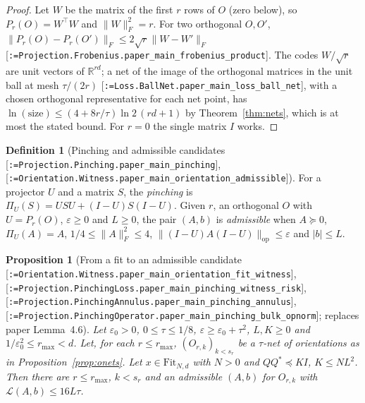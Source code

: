 \documentclass[11pt]{article}
\makeatletter
\newcommand{\formal@break}[1]{\@tfor\formal@tok:=#1\do{%
  \formal@tok
  \expandafter\ifx\formal@tok.\allowbreak\else
  \expandafter\ifx\formal@tok\_\allowbreak\fi\fi}}
\DeclareRobustCommand{\formal}[1]{\textnormal{[\texttt{\small\formal@break{#1}}]}}
\newcommand{\R}{\mathbb{R}}
\newcommand{\norm}[1]{\lVert #1\rVert}
\newcommand{\abs}[1]{\lvert #1\rvert}
\newcommand{\op}{\mathrm{op}}
\newcommand{\Fro}{F}
\newcommand{\Id}{I}
\newcommand{\Fit}{\mathrm{Fit}}
\theoremstyle{plain}
\newtheorem{proposition}[theorem]{Proposition}
\theoremstyle{definition}
\newtheorem{definition}[theorem]{Definition}
\makeatother
\begin{document}
\begin{proof}
Let $W$ be the matrix of the first $r$ rows of $O$ (zero below), so
$P_r(O) = W^{\top}W$ and $\norm{W}_\Fro^2 = r$. For two orthogonal $O, O'$,
$\norm{P_r(O) - P_r(O')}_\Fro \le 2\sqrt r\norm{W - W'}_\Fro$
\formal{Projection.Frobenius.paper\_main\_frobenius\_product}. The codes
$W/\sqrt r$ are unit vectors of $\R^{rd}$; a net of the image of the
orthogonal matrices in the unit ball at mesh $\tau/(2r)$
\formal{Loss.BallNet.paper\_main\_loss\_ball\_net}, with a chosen orthogonal
representative for each net point, has $\ln(\text{size}) \le (4 + 8r/\tau)\ln2\,(rd + 1)$
by Theorem~\ref{thm:nets}, which is at most the stated bound. For $r = 0$
the single matrix $\Id$ works.
\end{proof}

\begin{definition}[Pinching and admissible candidates \formal{Projection.Pinching.paper\_main\_pinching}, \formal{Orientation.Witness.paper\_main\_orientation\_admissible}]
For a projector $U$ and a matrix $S$, the \emph{pinching} is
$\Pi_U(S) = USU + (\Id - U)S(\Id - U)$. Given $r$, an orthogonal $O$ with
$U = P_r(O)$, $\varepsilon \ge 0$ and $L \ge 0$, the pair $(A, b)$ is
\emph{admissible} when $A \succeq 0$, $\Pi_U(A) = A$,
$1/4 \le \norm{A}_\Fro^2 \le 4$, $\norm{(\Id - U)A(\Id - U)}_\op \le \varepsilon$
and $\abs{b} \le L$.
\end{definition}

\begin{proposition}[From a fit to an admissible candidate \formal{Orientation.Witness.paper\_main\_orientation\_fit\_witness}, \formal{Projection.PinchingLoss.paper\_main\_pinching\_witness\_risk}, \formal{Projection.PinchingAnnulus.paper\_main\_pinching\_annulus}, \formal{Projection.PinchingOperator.paper\_main\_pinching\_bulk\_opnorm}; replaces paper Lemma~4.6]\label{prop:witness}
Let $\varepsilon_0 > 0$, $0 \le \tau \le 1/8$, $\varepsilon \ge \varepsilon_0 + \tau^2$,
$L, K \ge 0$ and $1/\varepsilon_0^2 \le r_{\max} < d$. Let, for each
$r \le r_{\max}$, $(O_{r,k})_{k<s_r}$ be a $\tau$-net of orientations as in
Proposition~\ref{prop:onets}. Let $x \in \Fit_{N,d}$ with $N > 0$ and
$QQ^{*} \preceq K\Id$, $K \le NL^2$. Then there are $r \le r_{\max}$, $k < s_r$
and an admissible $(A, b)$ for $O_{r,k}$ with $\mathcal{L}(A, b) \le 16L\tau$.
\end{proposition}
\end{document}
